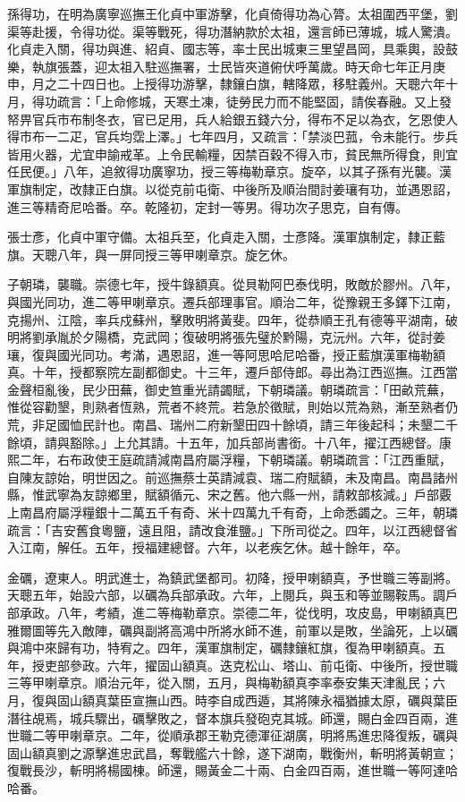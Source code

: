 \begin{pinyinscope}
孫得功，在明為廣寧巡撫王化貞中軍游擊，化貞倚得功為心膂。太祖圍西平堡，劉渠等赴援，令得功從。渠等戰死，得功潛納款於太祖，還言師已薄城，城人驚潰。化貞走入關，得功與進、紹貞、國志等，率士民出城東三里望昌岡，具乘輿，設鼓樂，執旗張蓋，迎太祖入駐巡撫署，士民皆夾道俯伏呼萬歲。時天命七年正月庚申，月之二十四日也。上授得功游擊，隸鑲白旗，轄降眾，移駐義州。天聰六年十月，得功疏言：「上命修城，天寒土凍，徒勞民力而不能堅固，請俟春融。又上發帑畀官兵市布制冬衣，官已足用，兵人給銀五錢六分，得布不足以為衣，乞恩使人得市布一二疋，官兵均霑上澤。」七年四月，又疏言：「禁淡巴菰，令未能行。步兵皆用火器，尤宜申諭戒革。上令民輸糧，因禁百穀不得入市，貧民無所得食，則宜任民便。」八年，追敘得功廣寧功，授三等梅勒章京。旋卒，以其子孫有光襲。漢軍旗制定，改隸正白旗。以從克前屯衛、中後所及順治間討姜瓖有功，並遇恩詔，進三等精奇尼哈番。卒。乾隆初，定封一等男。得功次子思克，自有傳。

張士彥，化貞中軍守備。太祖兵至，化貞走入關，士彥降。漢軍旗制定，隸正藍旗。天聰八年，與一屏同授三等甲喇章京。旋乞休。

子朝璘，襲職。崇德七年，授牛錄額真。從貝勒阿巴泰伐明，敗敵於膠州。八年，與國光同功，進二等甲喇章京。遷兵部理事官。順治二年，從豫親王多鐸下江南，克揚州、江陰，率兵戍蘇州，擊敗明將黃斐。四年，從恭順王孔有德等平湖南，破明將劉承胤於夕陽橋，克武岡；復破明將張先璧於黔陽，克沅州。六年，從討姜瓖，復與國光同功。考滿，遇恩詔，進一等阿思哈尼哈番，授正藍旗漢軍梅勒額真。十年，授都察院左副都御史。十三年，遷戶部侍郎。尋出為江西巡撫。江西當金聲桓亂後，民少田蕪，御史笪重光請蠲賦，下朝璘議。朝璘疏言：「田畝荒蕪，惟從容勸墾，則熟者恆熟，荒者不終荒。若急於徵賦，則始以荒為熟，漸至熟者仍荒，非足國恤民計也。南昌、瑞州二府新墾田四十餘頃，請三年後起科；未墾二千餘頃，請與豁除。」上允其請。十五年，加兵部尚書銜。十八年，擢江西總督。康熙二年，右布政使王庭疏請減南昌府屬浮糧，下朝璘議。朝璘疏言：「江西重賦，自陳友諒始，明世因之。前巡撫蔡士英請減袁、瑞二府賦額，未及南昌。南昌諸州縣，惟武寧為友諒鄉里，賦額循元、宋之舊。他六縣一州，請敕部核減。」戶部覈上南昌府屬浮糧銀十二萬五千有奇、米十四萬九千有奇，上命悉蠲之。三年，朝璘疏言：「吉安舊食粵鹽，遠且阻，請改食淮鹽。」下所司從之。四年，以江西總督省入江南，解任。五年，授福建總督。六年，以老疾乞休。越十餘年，卒。

金礪，遼東人。明武進士，為鎮武堡都司。初降，授甲喇額真，予世職三等副將。天聰五年，始設六部，以礪為兵部承政。六年，上閱兵，與玉和等並賜鞍馬。調戶部承政。八年，考績，進二等梅勒章京。崇德二年，從伐明，攻皮島，甲喇額真巴雅爾圖等先入敵陣，礪與副將高鴻中所將水師不進，前軍以是敗，坐論死，上以礪與鴻中來歸有功，特宥之。四年，漢軍旗制定，礪隸鑲紅旗，復為甲喇額真。五年，授吏部參政。六年，擢固山額真。迭克松山、塔山、前屯衛、中後所，授世職三等甲喇章京。順治元年，從入關，五月，與梅勒額真李率泰安集天津亂民；六月，復與固山額真葉臣宣撫山西。時李自成西遁，其將陳永福猶據太原，礪與葉臣潛往覘焉，城兵驟出，礪擊敗之，督本旗兵發砲克其城。師還，賜白金四百兩，進世職二等甲喇章京。二年，從順承郡王勒克德渾征湖廣，明將馬進忠降復叛，礪與固山額真劉之源擊進忠武昌，奪戰艦六十餘，遂下湖南，戰衡州，斬明將黃朝宣；復戰長沙，斬明將楊國棟。師還，賜黃金二十兩、白金四百兩，進世職一等阿達哈哈番。


\end{pinyinscope}
